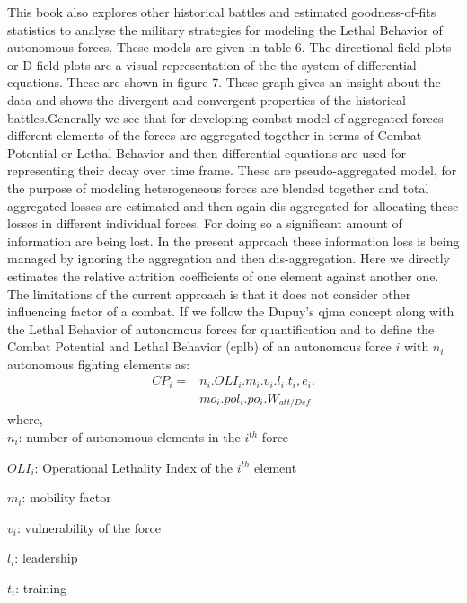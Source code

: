\documentclass[]{article}
\begin{document}
This book also explores other historical battles and estimated goodness-of-fits statistics to analyse the military strategies for modeling the Lethal Behavior \autocite{lethalRobots} of autonomous forces. These models are given in table 6. The directional field plots or D-field plots are a visual representation of the the system of differential equations. These are shown in figure 7. These graph gives an insight about the data and shows the divergent and convergent properties of the historical battles.Generally we see that for developing combat model of aggregated forces different elements of the forces are aggregated together in terms of Combat Potential or Lethal Behavior \autocite{lethalRobots} and then differential equations are used for representing their decay over time frame. These are pseudo-aggregated model, for the purpose of modeling heterogeneous forces are blended together and total aggregated losses are estimated and then again dis-aggregated for allocating these losses in different individual forces. For doing so a significant amount of information are being lost. In the present approach these information loss is being managed by ignoring the aggregation and then dis-aggregation. Here we directly estimates the relative attrition coefficients of one element against another one. 
The limitations of the current approach is that it does not consider other influencing factor of a combat. If we follow the Dupuy's \acrshort{qjma} concept along with the Lethal Behavior of autonomous forces \autocite{lethalRobots,Dupuy1975} for quantification and to define the Combat Potential and Lethal Behavior (\acrshort{cplb}) of an autonomous force $i$ with $n_i$ autonomous fighting elements as:
\begin{equation}
\begin{split}
    CP_i=&n_i.OLI_i.m_i.v_i.l_i.t_i,e_i.\\&mo_i.pol_i.po_i.
    W_{att/Def}
\end{split}
\end{equation}
 where,\\
 
    $n_i$: number of autonomous elements in the $i^{th}$ force
    
    $OLI_i$: Operational Lethality Index of the $i^{th}$ element
    
    $m_i$: mobility factor
    
    $v_i$: vulnerability of the force
    
    $l_i$: leadership
    
    $t_i$: training
\end{document}
